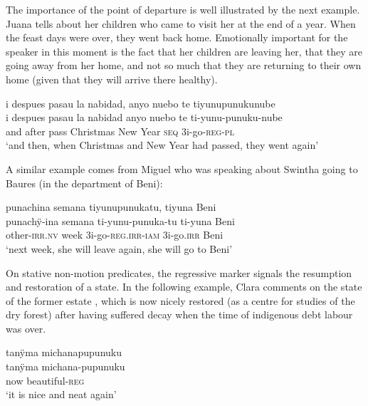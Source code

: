 The importance of the point of departure is well illustrated by the next example. Juana tells about her children who came to visit her at the end of a year. When the feast days were over, they went back home. Emotionally important for the speaker in this moment is the fact that her children are leaving her, that they are going away from her home, and not so much that they are returning to their own home (given that they will arrive there healthy).

\ea\label{ex:children-go-back}
\begingl 
\glpreamble i despues pasau la nabidad, anyo nuebo te tiyunupunukunube\\
\gla i despues pasau {la nabidad} {anyo nuebo} te ti-yunu-punuku-nube\\ 
\glb and after pass {Christmas} {New Year} \textsc{seq} 3i-go-\textsc{reg}-\textsc{pl}\\ 
\glft ‘and then, when Christmas and New Year had passed, they went again’\\ 
\endgl
\trailingcitation{[jxx-p120430l-1.315]}
\xe

A similar example comes from Miguel who was speaking about Swintha going to Baures (in the department of Beni):

\ea\label{ex:Swintha-back-Baures}
\begingl
\glpreamble punachina semana tiyunupunukatu, tiyuna Beni\\
\gla punachÿ-ina semana ti-yunu-punuka-tu ti-yuna Beni\\
\glb other-\textsc{irr.nv} week 3i-go-\textsc{reg.irr}-\textsc{iam} 3i-go.\textsc{irr} Beni\\
\glft ‘next week, she will leave again, she will go to Beni’
\endgl
\trailingcitation{[mxx-d110813s-2.043-044]}
\xe


On stative non-motion predicates, the regressive marker signals the resumption and restoration of a state. In the following example, Clara comments on the state of the former estate , which is now nicely restored (as a centre for studies of the dry forest) after having suffered decay when the time of indigenous debt labour was over.

\ea\label{ex:Altavista-regresseive}
\begingl 
\glpreamble tanÿma michanapupunuku\\
\gla tanÿma michana-pupunuku\\ 
\glb now beautiful-\textsc{reg}\\ 
\glft ‘it is nice and neat again’ \\ 
\endgl
\trailingcitation{[cux-c120414ls-1.152]}
\xe

